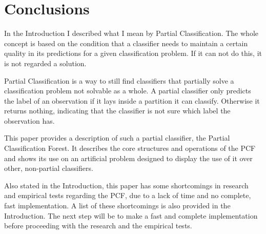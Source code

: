 \section{Conclusions}
\label{sec:conclusions}

In the Introduction I described what I mean by
Partial Classification. The whole concept is based on the
condition that a classifier needs to maintain a certain
quality in its predictions for a given classification
problem. If it can not do this, it is not regarded a
solution.

Partial Classification is a way to still find classifiers
that partially solve a classification problem not solvable
as a whole. A partial classifier only predicts the label
of an observation if it lays inside a partition it can
classify. Otherwise it returns nothing, indicating that
the classifier is not sure which label the observation has.

This paper provides a description of such a partial
classifier, the Partial Classification Forest. It
describes the core structures and operations of the PCF and
shows its use on an artificial problem designed to display
the use of it over other, non-partial classifiers.

Also stated in the Introduction, this paper has some
shortcomings in research and empirical tests regarding the
PCF, due to a lack of time and no complete, fast
implementation. A list of these shortcomings is also
provided in the Introduction. The next step will be to make
a fast and complete implementation before proceeding with
the research and the empirical tests.
